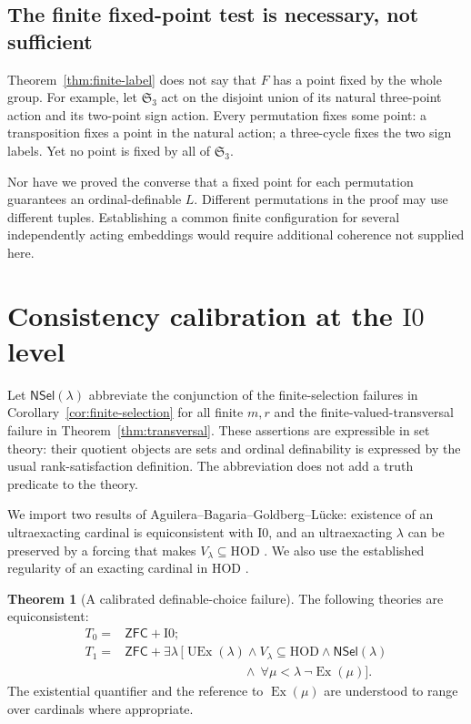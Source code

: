 \documentclass[11pt,letterpaper]{article}
\theoremstyle{definition}
\newtheorem{theorem}[definition]{Theorem}
\newcommand{\ZFC}{\mathsf{ZFC}}
\newcommand{\HOD}{\mathrm{HOD}}
\newcommand{\Ex}{\operatorname{Ex}}
\newcommand{\UEx}{\operatorname{UEx}}
\newcommand{\Izero}{\mathrm{I0}}
\newcommand{\Sym}{\mathfrak S}
\newcommand{\NSel}{\mathsf{NSel}}
\begin{document}
\subsection{The finite fixed-point test is necessary, not sufficient}

Theorem~\ref{thm:finite-label} does not say that $F$ has a point fixed by the whole group. For example, let $\Sym_3$ act on the disjoint union of its natural three-point action and its two-point sign action. Every permutation fixes some point: a transposition fixes a point in the natural action; a three-cycle fixes the two sign labels. Yet no point is fixed by all of $\Sym_3$.

Nor have we proved the converse that a fixed point for each permutation guarantees an ordinal-definable $L$. Different permutations in the proof may use different tuples. Establishing a common finite configuration for several independently acting embeddings would require additional coherence not supplied here.

\section{Consistency calibration at the \texorpdfstring{$\Izero$}{I0} level}\label{sec:consistency}

Let $\NSel(\lambda)$ abbreviate the conjunction of the finite-selection failures in Corollary~\ref{cor:finite-selection} for all finite $m,r$ and the finite-valued-transversal failure in Theorem~\ref{thm:transversal}. These assertions are expressible in set theory: their quotient objects are sets and ordinal definability is expressed by the usual rank-satisfaction definition. The abbreviation does not add a truth predicate to the theory.

We import two results of Aguilera--Bagaria--Goldberg--L\"ucke: existence of an ultraexacting cardinal is equiconsistent with $\Izero$, and an ultraexacting $\lambda$ can be preserved by a forcing that makes $V_\lambda\subseteq\HOD$ \cite[Theorem A and Proposition 3.9]{abgl}. We also use the established regularity of an exacting cardinal in HOD \cite[Theorem 2.10]{abl}.

\begin{theorem}[A calibrated definable-choice failure]\label{thm:equiconsistency}
The following theories are equiconsistent:
\begin{align*}
 T_0={}&\ZFC+\Izero;\\
 T_1={}&\ZFC+\exists\lambda\,\bigl[
       \UEx(\lambda)\wedge V_\lambda\subseteq\HOD
       \wedge\NSel(\lambda)\\[-2pt]
     &\hspace{112pt}\wedge\ \forall\mu<\lambda\ \neg\Ex(\mu)\bigr].
\end{align*}
The existential quantifier and the reference to $\Ex(\mu)$ are understood to range over cardinals where appropriate.
\end{theorem}
\end{document}
